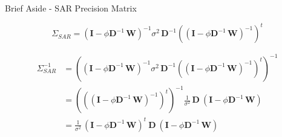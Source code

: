 \documentclass[11pt,ignorenonframetext,]{beamer}
\begin{document}
\begin{frame}{Brief Aside - SAR Precision Matrix}
\protect\hypertarget{brief-aside---sar-precision-matrix}{}

\[ 
\Sigma_{SAR} = (\symbf{I}-\phi \symbf{D}^{-1} \, \symbf{W})^{-1} \sigma^2 \, \symbf{D}^{-1} \left((\symbf{I}-\phi \symbf{D}^{-1} \, \symbf{W})^{-1}\right)^t
\]

\vspace{6mm}

\[ \begin{aligned}
\Sigma^{-1}_{SAR} 
  &= \left( (\symbf{I}-\phi \symbf{D}^{-1} \, \symbf{W})^{-1} \sigma^2 \, \symbf{D}^{-1} \left((\symbf{I}-\phi \symbf{D}^{-1} \, \symbf{W})^{-1}\right)^t \right)^{-1} \\
  &= \left( \left( (\symbf{I}-\phi \symbf{D}^{-1} \, \symbf{W})^{-1}\right)^t\right)^{-1} \frac{1}{\sigma^2} \, \symbf{D} ~ (\symbf{I}-\phi \symbf{D}^{-1} \, \symbf{W}) \\
  &= \frac{1}{\sigma^2} \, (\symbf{I}-\phi \symbf{D}^{-1} \, \symbf{W})^t ~ \symbf{D} ~ (\symbf{I}-\phi \symbf{D}^{-1} \, \symbf{W}) \\
\end{aligned}\]

\end{frame}
\end{document}
